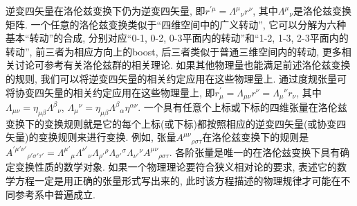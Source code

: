 逆变四矢量在洛伦兹变换下仍为逆变四矢量, 即$ r^{\prime\mu} = \varLambda^{\mu}{\!}_{\nu} r^{\nu} $, 其中$ \varLambda^{\mu}{\!}_{\nu} $是洛伦兹变换矩阵. 一个任意的洛伦兹变换类似于``四维空间中的广义转动'', 它可以分解为六种基本``转动''的合成, 分别对应``0-1, 0-2, 0-3平面内的转动''和``1-2, 1-3, 2-3平面内的转动'', 前三者为相应方向上的boost, 后三者类似于普通三维空间内的转动, 更多相关讨论可参考有关洛伦兹群的相关理论. 如果其他物理量也能满足前述洛伦兹变换的规则, 我们可以将逆变四矢量的相关约定应用在这些物理量上. 通过度规张量可将协变四矢量的相关约定应用在这些物理量上, 即$ r^{\prime}_{\mu} = \varLambda_{\mu\nu} r^{\nu} = \varLambda_{\mu}{\!}^{\nu} r_{\nu} $, 其中$ \varLambda_{\mu\nu} = \eta_{\mu\beta} \varLambda^{\beta}{\!}_{\nu} $, $ \varLambda_{\mu}{\!}^{\nu} = \eta_{\mu\beta} \varLambda^{\beta}{\!}_{\alpha} \eta^{\alpha\nu} $. 一个具有任意个上标或下标的四维张量在洛伦兹变换下的变换规则就是它的每个上标(或下标)都按照相应的逆变四矢量(或协变四矢量)的变换规则来进行变换. 例如, 张量$ A^{\mu\nu}{\!}_{\rho\sigma\tau} $在洛伦兹变换下的规则是$ A^{\prime\mu'\nu'}{\!}_{\rho'\sigma'\tau'} = \varLambda^{\mu'}{\!}_{\mu} \varLambda^{\nu'}{\!}_{\nu} \varLambda_{\rho'}{\!}^{\rho} \varLambda_{\sigma'}{\!}^{\sigma} \varLambda_{\nu'}{\!}^{\nu} A^{\mu\nu}{\!}_{\rho\sigma\tau} $. 各阶张量是唯一的在洛伦兹变换下具有确定变换性质的数学对象. 如果一个物理理论要符合狭义相对论的要求, 表述它的数学方程一定是用正确的张量形式写出来的, 此时该方程描述的物理规律才可能在不同参考系中普遍成立.

